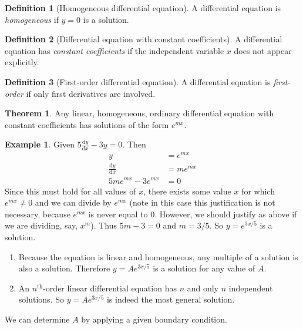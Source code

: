 \documentclass[a4paper]{article}
\theoremstyle{definition}
\newtheorem*{thm}{Theorem}
\newtheorem*{defi}{Definition}
\newtheorem*{eg}{Example}
\renewcommand{\d}{\mathrm{d}}
\begin{document}
\begin{defi}[Homogeneous differential equation]
  A differential equation is \emph{homogeneous} if $y=0$ is a solution.
\end{defi}

\begin{defi}[Differential equation with constant coefficients]
  A differential equation has \emph{constant coefficients} if the independent variable $x$ does not appear explicitly.
\end{defi}

\begin{defi}[First-order differential equation]
  A differential equation is \emph{first-order} if only first derivatives are involved.
\end{defi}

\begin{thm}
  Any linear, homogeneous, ordinary differential equation with constant coefficients has solutions of the form $e^{mx}$.
\end{thm}
\begin{eg}
  Given $5\frac{\d y}{\d x} - 3y = 0$. Then 
  \begin{align*}
    y &= e^{mx}\\
    \frac{\d y}{\d x} &= me^{mx}\\
    5me^{mx} - 3e^{mx} &= 0
  \end{align*}
  Since this must hold for all values of $x$, there exists some value $x$ for which $e^{mx} \not= 0$ and we can divide by $e^{mx}$ (note in this case this justification is not necessary, because $e^{mx}$ is never equal to 0. However, we should justify as above if we are dividing, say, $x^m$). Thus $5m - 3 = 0$ and $m = 3/5$. So $y = e^{3x/5}$ is a solution. 
\end{eg}

\begin{enumerate}
\item Because the equation is linear and homogeneous, any multiple of a solution is also a solution. Therefore $y = Ae^{3x/5}$ is a solution for any value of $A$. 
\item An $n^\text{th}$-order linear differential equation has $n$ and only $n$ independent solutions. So $y = Ae^{3x/5}$ is indeed the most general solution.
\end{enumerate}
We can determine $A$ by applying a given boundary condition.
\end{document}
